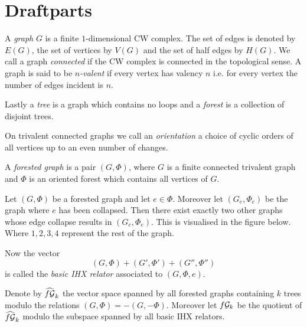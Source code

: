 %

\section{Draftparts}

\begin{definition}
	A \emph{graph} $G$ is a finite $1$-dimensional CW complex. The set of edges is denoted by $E(G)$, the set of vertices by  $V(G)$ and the set of half edges by  $H(G)$.
	We call a graph \emph{connected} if the CW complex is connected in the topological sense.
	A graph is said to be \emph{$n$-valent} if every vertex has valency $n$ i.e. for every vertex the number of edges incident is  $n$.

	Lastly a \emph{tree} is a graph which contains no loops and a \emph{forest} is a collection of disjoint trees.
\end{definition}

On trivalent connected graphs we call an \emph{orientation} a choice of cyclic orders of all vertices up to an even number of changes.

\begin{definition}
	A \emph{forested graph} is a pair $(G, \Phi)$, where $G$ is a finite connected trivalent graph and $\Phi$ is an oriented forest which contains all vertices of $G$. 
\end{definition}

\begin{definition}
Let $(G,\Phi)$ be a forested graph and let  $e \in \Phi$. Moreover let $(G_{e},\Phi_{e})$ be the graph where $e$ has been collapsed.
Then there exist exactly two other graphs whose edge collapse results in $(G_{e},\Phi_{e})$. This is visualised in the figure below.
Where  $1,2,3,4$ represent the rest of the graph.

Now the vector 
\[
	(G,\Phi) + (G',\Phi') + (G'',\Phi'')
\]
is called the \emph{basic IHX relator} associated to $(G,\Phi,e)$.
\end{definition}

Denote by $\widehat{f\mathcal{G}}_{k}$ the vector space spanned by all forested graphs containing $k$ trees modulo the relations $(G,\Phi) = -(G,-\Phi)$.
Moreover let $f\mathcal{G}_{k}$ be the quotient of $\widehat{f\mathcal{G}}_{k}$ modulo the subspace spanned by all basic IHX relators.


